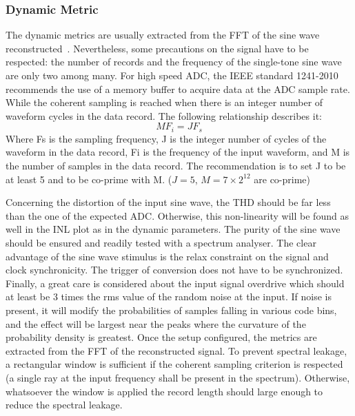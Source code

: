     \subsubsection{Dynamic Metric}
The dynamic metrics are usually extracted from the FFT of the sine wave reconstructed~\cite{IEEESTD1241-2010}. Nevertheless, some precautions on the signal have to be respected: the number of records and the frequency of the single-tone sine wave are only two among many.
For high speed ADC, the IEEE standard 1241-2010 recommends the use of a memory buffer to acquire data at the ADC sample rate. While the coherent sampling is reached when there is an integer number of waveform cycles in the data record. The following relationship describes it:
    \begin{equation}
        M F_i = J F_s
    \end{equation}
Where Fs is the sampling frequency, J is the integer number of cycles of the waveform in the data record, Fi is the frequency of the input waveform, and M is the number of samples in the data record. The recommendation is to set J to be at least 5 and to be co-prime with M. ($J = 5$, $M = 7\times2^{12}$ are co-prime)

Concerning the distortion of the input sine wave, the THD should be far less than the one of the expected ADC\@. Otherwise, this non-linearity will be found as well in the INL plot as in the dynamic parameters. The purity of the sine wave should be ensured and readily tested with a spectrum analyser.
The clear advantage of the sine wave stimulus is the relax constraint on the signal and clock synchronicity. The trigger of conversion does not have to be synchronized.
Finally, a great care is considered about the input signal overdrive which should at least be 3 times the rms value of the random noise at the input. If noise is present, it will modify the probabilities of samples falling in various code bins, and the effect will be largest near the peaks where the curvature of the probability density is greatest.
Once the setup configured, the metrics are extracted from the FFT of the reconstructed signal. To prevent spectral leakage, a rectangular window is sufficient if the coherent sampling criterion is respected (a single ray at the input frequency shall be present in the spectrum). Otherwise, whatsoever the window is applied the record length should large enough to reduce the spectral leakage.

